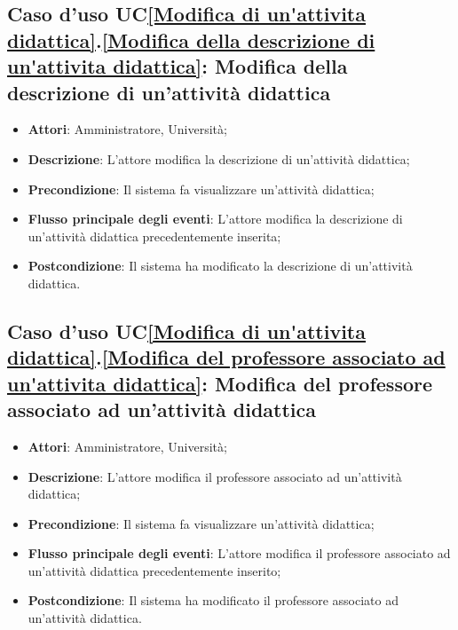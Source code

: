 \subsection{Caso d'uso UC\ref{Modifica di un'attivita didattica}.\ref{Modifica della descrizione di un'attivita didattica}: Modifica della descrizione di un'attività didattica}
\begin{itemize}
	\item \textbf{Attori}: Amministratore, Università;
	\item \textbf{Descrizione}: L'attore modifica la descrizione di un'attività didattica;
	
	\item \textbf{Precondizione}: Il sistema fa visualizzare un'attività didattica;
	
	
	\item \textbf{Flusso principale degli eventi}: L'attore modifica la descrizione di un'attività didattica precedentemente inserita;
	
	\item \textbf{Postcondizione}: Il sistema ha modificato la descrizione di un'attività didattica.
	
\end{itemize}

\subsection{Caso d'uso UC\ref{Modifica di un'attivita didattica}.\ref{Modifica del professore associato ad un'attivita didattica}: Modifica del professore associato ad un'attività didattica}
\begin{itemize}
	\item \textbf{Attori}: Amministratore, Università;
	\item \textbf{Descrizione}: L'attore modifica il professore associato ad un'attività didattica;
	
	\item \textbf{Precondizione}: Il sistema fa visualizzare un'attività didattica;
	
	
	\item \textbf{Flusso principale degli eventi}: L'attore modifica il professore associato ad un'attività didattica precedentemente inserito;
	
	\item \textbf{Postcondizione}: Il sistema ha modificato il professore associato ad un'attività didattica.
	
\end{itemize}

